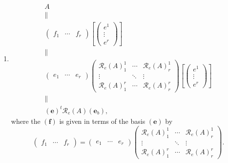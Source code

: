 \documentclass[aps,preprint]{revtex4}
\begin{document}
\begin{enumerate}
\begin{enumerate}
\item 
\begin{gather}
A \\
\parallel \\
\left( 
\begin{array}{ccc}
f_{1} & \cdots & f_{r}%
\end{array}%
\right) \left[ \left( 
\begin{array}{c}
e^{1} \\ 
\vdots \\ 
e^{r}%
\end{array}%
\right) \right] \\
\parallel \\
\left( 
\begin{array}{ccc}
e_{1} & \cdots & e_{r}%
\end{array}%
\right) \left( 
\begin{array}{ccc}
\mathcal{R}_{e}\left( A\right) _{1}^{1} & \cdots & \mathcal{R}_{e}\left(
A\right) _{r}^{1} \\ 
\vdots & \ddots & \vdots \\ 
\mathcal{R}_{e}\left( A\right) _{1}^{r} & \cdots & \mathcal{R}_{e}\left(
A\right) _{r}^{r}%
\end{array}%
\right) \left[ \left( 
\begin{array}{c}
e^{1} \\ 
\vdots \\ 
e^{r}%
\end{array}%
\right) \right] \\
\parallel \\
\left( \boldsymbol{e}\right) ^{t}\mathcal{R}_{e}\left( A\right) \left( 
\boldsymbol{e}_{b}\right) ,
\end{gather}%
where the $\left( \boldsymbol{f}\right) $ is given in terms of the basis $%
\left( \boldsymbol{e}\right) $ by 
\begin{equation}
\left( 
\begin{array}{ccc}
f_{1} & \cdots & f_{r}%
\end{array}%
\right) =\left( 
\begin{array}{ccc}
e_{1} & \cdots & e_{r}%
\end{array}%
\right) \left( 
\begin{array}{ccc}
\mathcal{R}_{e}\left( A\right) _{1}^{1} & \cdots & \mathcal{R}_{e}\left(
A\right) _{r}^{1} \\ 
\vdots & \ddots & \vdots \\ 
\mathcal{R}_{e}\left( A\right) _{1}^{r} & \cdots & \mathcal{R}_{e}\left(
A\right) _{r}^{r}%
\end{array}%
\right) .
\end{equation}


\end{enumerate}
\end{enumerate}
\end{document}
